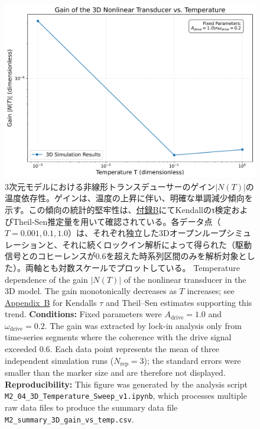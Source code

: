 \documentclass[a4paper,11pt,ja=standard,lualatex]{bxjsarticle}
\begin{document}
\begin{figure}[htbp]
    \centering
    \includegraphics[width=0.8\linewidth]{Fig1_Gain_vs_Temp.pdf}
    \caption{3次元モデルにおける非線形トランスデューサーのゲイン$|N(T)|$の温度依存性。ゲインは、温度の上昇に伴い、明確な単調減少傾向を示す。この傾向の統計的堅牢性は、\hyperref[sec:appendix_stats]{付録B}にてKendallのτ検定およびTheil-Sen推定量を用いて確認されている。各データ点（$T = 0.001, 0.1, 1.0$）は、それぞれ独立した3Dオープンループシミュレーションと、それに続くロックイン解析によって得られた（駆動信号とのコヒーレンスが0.6を超えた時系列区間のみを解析対象とした）。両軸とも対数スケールでプロットしている。
    \newline\newline
    Temperature dependence of the gain $|N(T)|$ of the nonlinear transducer in the 3D model. The gain monotonically decreases as $T$ increases; see \hyperref[sec:appendix_stats]{Appendix~B} for Kendall\textquotesingle s $\tau$ and Theil--Sen estimates supporting this trend.
    \newline\newline
    \textbf{Conditions:} Fixed parameters were $A_{\mathrm{drive}} = 1.0$ and $\omega_{\mathrm{drive}} = 0.2$. The gain was extracted by lock-in analysis only from time-series segments where the coherence with the drive signal exceeded 0.6. Each data point represents the mean of three independent simulation runs ($N_{\mathrm{rep}}=3$); the standard errors were smaller than the marker size and are therefore not displayed.
    \textbf{Reproducibility:} This figure was generated by the analysis script \texttt{M2\_04\_3D\_Temperature\_Sweep\_v1.ipynb}, which processes multiple raw data files to produce the summary data file \texttt{M2\_summary\_3D\_gain\_vs\_temp.csv}.}
    \label{fig:gain_vs_temp_3d}
\end{figure}
\end{document}
